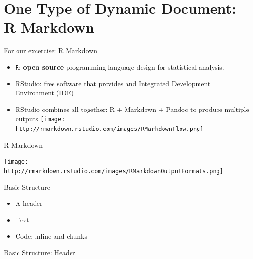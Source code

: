\section{One Type of Dynamic Document: R
Markdown}\label{one-type-of-dynamic-document-r-markdown}

\begin{frame}[fragile]{For our excercise: R Markdown}

\begin{itemize}
\tightlist
\item
  \texttt{R}: \textbf{open source} programming language design for
  statistical analysis.\\
\item
  RStudio: free software that provides and Integrated Development
  Environment (IDE)\\
\item
  RStudio combines all together: R + Markdown + Pandoc to produce
  multiple outputs
  \texttt{[image: http://rmarkdown.rstudio.com/images/RMarkdownFlow.png]}
\end{itemize}

\end{frame}

\begin{frame}{R Markdown}

\texttt{[image: http://rmarkdown.rstudio.com/images/RMarkdownOutputFormats.png]}

\end{frame}

\begin{frame}{Basic Structure}

\begin{itemize}
\tightlist
\item
  A header
\item
  Text
\item
  Code: inline and chunks
\end{itemize}

\end{frame}

\begin{frame}[fragile]{Basic Structure: Header}

\begin{Shaded}
\begin{Highlighting}[]
\OperatorTok{---}
\OperatorTok{:}
\OperatorTok{:}
\OperatorTok{:}\StringTok{ }
\OperatorTok{---}
\end{Highlighting}
\end{Shaded}

\end{frame}

